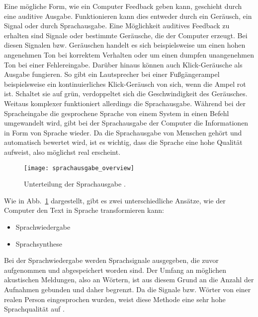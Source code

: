 Eine mögliche Form, wie ein Computer Feedback geben kann, geschieht durch eine auditive Ausgabe. Funktionieren kann dies entweder durch ein Geräusch, ein Signal oder durch Sprachausgabe.
\newline \newline
Eine Möglichkeit auditives Feedback zu erhalten sind Signale oder bestimmte Geräusche, die der Computer erzeugt. Bei diesen Signalen bzw. Geräuschen handelt es sich beispielsweise um einen hohen angenehmen Ton bei korrektem Verhalten oder um einen dumpfen unangenehmen Ton bei einer Fehlereingabe. Darüber hinaus können auch \zB Klick-Geräusche als Ausgabe fungieren. So gibt ein Lautsprecher bei einer Fußgängerampel beispielsweise ein kontinuierliches Klick-Geräusch von sich, wenn die Ampel rot ist. Schaltet sie auf grün, verdoppeltet sich die Geschwindigkeit des Geräusches.
\newline \newline
Weitaus komplexer funktioniert allerdings die Sprachausgabe. Während bei der Spracheingabe die gesprochene Sprache von einem System in einen Befehl umgewandelt wird, gibt bei der Sprachausgabe der Computer die Informationen in Form von Sprache wieder. Da die Sprachausgabe von Menschen gehört und automatisch bewertet wird, ist es wichtig, dass die Sprache eine hohe Qualität aufweist, also möglichst real erscheint. 
\begin{figure}
\centering
\texttt{[image: sprachausgabe\_overview]}
\caption{Unterteilung der Sprachausgabe \cite{FellbaumSprache}.}
\label{fig:SprachausgabeOverview}
\end{figure}
\newline \newline
Wie in Abb.~\ref{fig:SprachausgabeOverview} dargestellt, gibt es zwei unterschiedliche Ansätze, wie der Computer den Text in Sprache transformieren kann:
\begin{itemize}
      \item Sprachwiedergabe
      \item Sprachsynthese
\end{itemize}
\vspace{\baselineskip}
Bei der Sprachwiedergabe werden Sprachsignale ausgegeben, die zuvor aufgenommen und abgespeichert worden sind. Der Umfang an möglichen akustischen Meldungen, also an Wörtern, ist aus diesem Grund an die Anzahl der Aufnahmen gebunden und daher begrenzt. Da die Signale bzw. Wörter von einer realen Person eingesprochen wurden, weist diese Methode eine sehr hohe Sprachqualität auf \cite{KaufmannPfisterSprache}.

